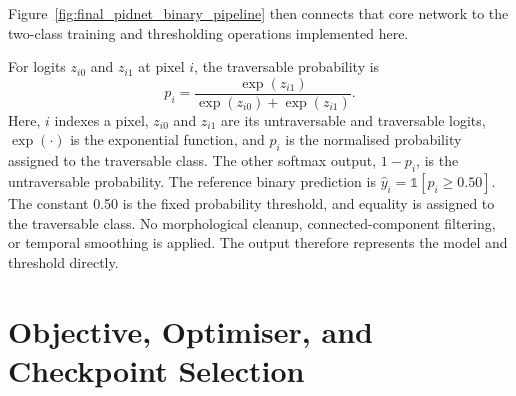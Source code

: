 Figure~\ref{fig:final_pidnet_binary_pipeline} then connects that core network
to the two-class training and thresholding operations implemented here.

For logits $z_{i0}$ and $z_{i1}$ at pixel $i$, the traversable probability is
\begin{equation}
 p_i =
 \frac{\exp(z_{i1})}
 {\exp(z_{i0})+\exp(z_{i1})}.
 \label{eq:pidnet_softmax}
\end{equation}
Here, $i$ indexes a pixel, $z_{i0}$ and $z_{i1}$ are its untraversable and
traversable logits, $\exp(\cdot)$ is the exponential function, and $p_i$ is
the normalised probability assigned to the traversable class. The other
softmax output, $1-p_i$, is the untraversable probability.
The reference binary prediction is $\hat y_i=\mathbb{1}[p_i\geq0.50]$.
The constant 0.50 is the fixed probability threshold, and equality is assigned
to the traversable class. No morphological cleanup, connected-component filtering, or temporal smoothing
is applied. The output therefore represents the model and threshold directly.

\section{Objective, Optimiser, and Checkpoint Selection}

